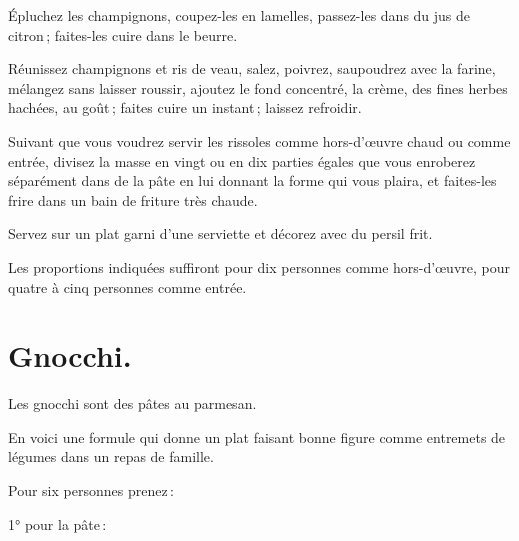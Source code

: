 Épluchez les champignons, coupez-les en lamelles, passez-les dans du jus de
citron ; faites-les cuire dans le beurre.

Réunissez champignons et ris de veau, salez, poivrez, saupoudrez avec la
farine, mélangez sans laisser roussir, ajoutez le fond concentré, la crème, des
fines herbes hachées, au goût ; faites cuire un instant ; laissez refroidir.

Suivant que vous voudrez servir les rissoles comme hors-d'œuvre chaud ou comme
entrée, divisez la masse en vingt ou en dix parties égales que vous enroberez
séparément dans de la pâte en lui donnant la forme qui vous plaira, et
faites-les frire dans un bain de friture très chaude.

Servez sur un plat garni d'une serviette et décorez avec du persil frit.

Les proportions indiquées suffiront pour dix personnes comme hors-d'œuvre,
pour quatre à cinq personnes comme entrée.

\section*{\centering Gnocchi.}
{}

Les gnocchi sont des pâtes au parmesan.

En voici une formule qui donne un plat faisant bonne figure comme entremets de
légumes dans un repas de famille.

\medskip

Pour six personnes prenez :

\medskip

1° pour la pâte :

